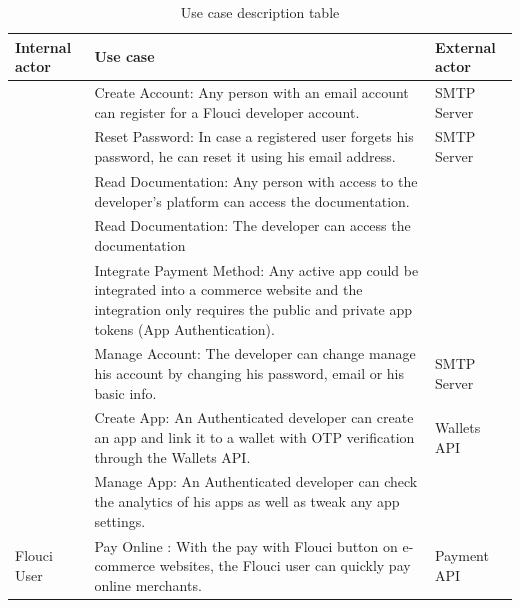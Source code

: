 \begin{spacing}{1.2}
\begin{table}[!h]
	\centering
	\caption{Use case description table}
	\footnotesize
	\begin{tabularx}
	{\linewidth}{|>{\centering{}\vspace*{\fill}}X|>{\centering{}\vspace*{\fill}}X|>{\vspace*{\fill}}X<{\centering{}}|}	
			\hline 
			 \bfseries Internal actor & \bfseries Use case &\bfseries External actor \\
			\hline 
			\multirow{3}{*}{Anonymous Developer}			&	Create Account: Any person with an email account can register for a Flouci developer account. 	&	SMTP Server			\\
			\cline{2-3}
				& Reset Password: In case a registered user forgets his password, he can reset it using his email address. 		&		SMTP Server		\\
				\cline{2-3}
					&	Read Documentation: Any person with access to the developer's platform can access the documentation.	&				\\
			\hline 
			\multirow{5}{*}{Registred Developer}					&	Read Documentation: The developer can access the documentation 	&				\\
			\cline{2-3}
			&	Integrate Payment Method: Any active app could be integrated into a commerce website and the integration only requires the public and private app tokens (App Authentication).	&				\\
			\cline{2-3}
					&	Manage Account:    The developer can change manage his account by changing his password, email or his basic info.	&		SMTP Server	\\
					\cline{2-3}
					&	Create App: An Authenticated developer can create an app and link it to a wallet with OTP verification through the Wallets API.	&			Wallets API	\\
					\cline{2-3}
					&	Manage App:	 An Authenticated  developer can check the analytics of his apps as well as tweak any app settings. &				\\		
					
			\hline 
			Flouci User	& Pay Online : With the pay with Flouci button on e-commerce websites, the Flouci user can quickly pay online merchants.  	&	Payment API	\\
			
			\hline
	\end{tabularx}
	\label{tab:usecasediagram}
\end{table}



\end{spacing}
